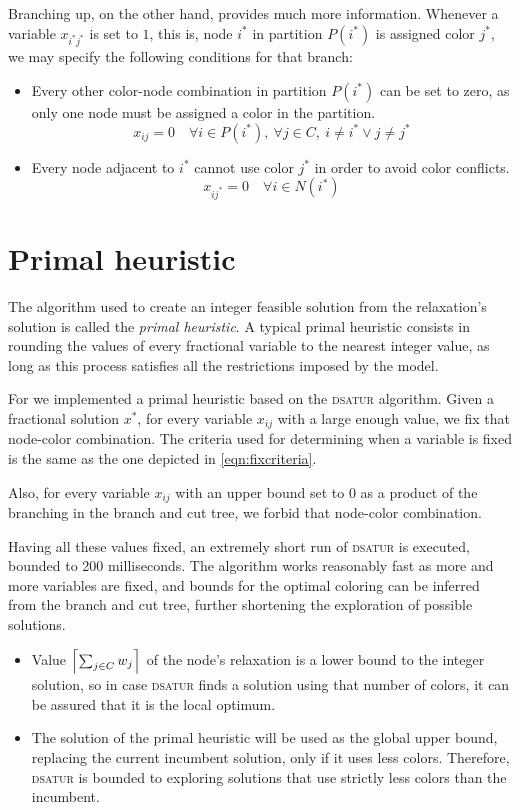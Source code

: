 Branching up, on the other hand, provides much more information. Whenever a variable $x_{i^*j^*}$ is set to $1$, this is, node $i^*$ in partition $P(i^*)$ is assigned color $j^*$, we may specify the following conditions for that branch:

\begin{itemize}
\item Every other color-node combination in partition $P(i^*)$ can be set to zero, as only one node must be assigned a color in the partition.
\[
x_{ij} = 0 \quad \forall i \in P(i^*),\ \forall j \in C,\ i \neq i^* \vee j \neq j^*
\]

\item Every node adjacent to $i^*$ cannot use color $j^*$ in order to avoid color conflicts.
\[
x_{ij^*} = 0 \quad \forall i \in N(i^*)
\]
\end{itemize}

\section{Primal heuristic}
\label{subsec:alg:primal}

The algorithm used to create an integer feasible solution from the relaxation's solution is called the \textit{primal heuristic}. A typical primal heuristic consists in rounding the values of every fractional variable to the nearest integer value, as long as this process satisfies all the restrictions imposed by the model.

For \PCP{} we implemented a primal heuristic based on the \textsc{dsatur} algorithm. Given a fractional solution $x^*$, for every variable $x_{ij}$ with a large enough value, we fix that node-color combination. The criteria used for determining when a variable is fixed is the same as the one depicted in \ref{eqn:fixcriteria}.

Also, for every variable $x_{ij}$ with an upper bound set to $0$ as a product of the branching in the branch and cut tree, we forbid that node-color combination.

Having all these values fixed, an extremely short run of \textsc{dsatur} is executed, bounded to 200 milliseconds. The algorithm works reasonably fast as more and more variables are fixed, and bounds for the optimal coloring can be inferred from the branch and cut tree, further shortening the exploration of possible solutions. 
\begin{itemize}
\item{Value $\left\lceil \sum_{j \in C} w_j \right\rceil$ of the node's relaxation is a lower bound to the integer solution, so in case \textsc{dsatur} finds a solution using that number of colors, it can be assured that it is the local optimum.}
\item{The solution of the primal heuristic will be used as the global upper bound, replacing the current incumbent solution, only if it uses less colors. Therefore, \textsc{dsatur} is bounded to exploring solutions that use strictly less colors than the incumbent.}
\end{itemize}

